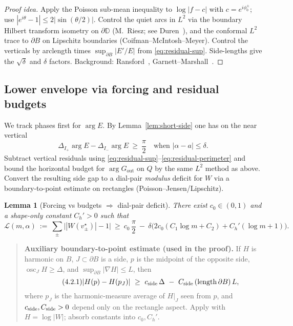 \documentclass[11pt]{article}
\numberwithin{equation}{section}
\newtheorem{lemma}[theorem]{Lemma}
\theoremstyle{remark}
\newcommand{\D}{\mathbb{D}}
\newcommand{\osc}{\operatorname{osc}}
\newcommand{\Gout}{G_{\mathrm{out}}}
\begin{document}
\begin{proof}[Proof idea]
Apply the Poisson sub-mean inequality to $\log|f-c|$ with $c=e^{i\phi_0^\pm}$; use $|e^{i\theta}-1|\le 2|\sin(\theta/2)|$. Control the quiet arcs in $L^2$ via the boundary Hilbert transform isometry on $\partial\D$ (M.~Riesz; see Duren~\cite[§§I.3, I.6--I.7]{DurenHp}), and the conformal $L^2$ trace to $\partial B$ on Lipschitz boundaries (Coifman--McIntosh--Meyer). Control the verticals by arclength times $\sup_{\partial B}|E'/E|$ from \eqref{eq:residual-sup}. Side-lengths give the $\sqrt{\delta}$ and $\delta$ factors. Background: Ransford~\cite[§3.9]{Ransford}, Garnett--Marshall~\cite[Chs.~IV--V]{GarnettMarshall}.
\end{proof}

\subsection{Lower envelope via forcing and residual budgets}\label{subsec:lower}

We track phases first for $\arg E$. By Lemma~\ref{lem:short-side} one has on the near vertical
\[
\Delta_{I_+}\arg E - \Delta_{I_-}\arg E\ \ge\ \frac{\pi}{2}\quad\text{when }|\alpha-a|\le \delta.
\]
Subtract vertical residuals using \eqref{eq:residual-sup}--\eqref{eq:residual-perimeter} and bound the horizontal budget for $\arg\Gout$ on $Q$ by the same $L^2$ method as above. Convert the resulting side gap to a dial-pair \emph{modulus} deficit for $W$ via a boundary-to-point estimate on rectangles (Poisson--Jensen/Lipschitz).

\begin{lemma}[Forcing vs budgets $\Rightarrow$ dial-pair deficit]\label{lem:lower-envelope}
There exist $c_0\in(0,1)$ and a shape-only constant $C_h'>0$ such that
\begin{equation}\label{eq:lower}
\mathcal{L}(m,\alpha)\ :=\ \sum_{\pm}\big||W(v_\pm^\star)|-1\big|
\ \ge\ c_0\,\frac{\pi}{2}\ -\ \delta\Big(2c_0(C_1\log m+C_2)+C_h'(\log m+1)\Big).
\end{equation}
\end{lemma}

\begin{quote}\small
\textbf{Auxiliary boundary-to-point estimate (used in the proof).}
If $H$ is harmonic on $B$, $J\subset\partial B$ is a side, $p$ is the midpoint of the opposite side, $\osc_{J}H\ge\Delta$, and $\sup_{\partial B}|\nabla H|\le L$, then
\begin{equation}\tag{4.2.1}\label{eq:boundary-to-point}
|H(p)-H(p_J)|\ \ge\ c_{\rm side}\,\Delta\ -\ C_{\rm side}\,(\operatorname{length}\partial B)\,L,
\end{equation}
where $p_J$ is the harmonic-measure average of $H|_J$ seen from $p$, and $c_{\rm side},C_{\rm side}>0$ depend only on the rectangle aspect. Apply with $H=\log|W|$; absorb constants into $c_0,C_h'$.
\end{quote}
\end{document}
